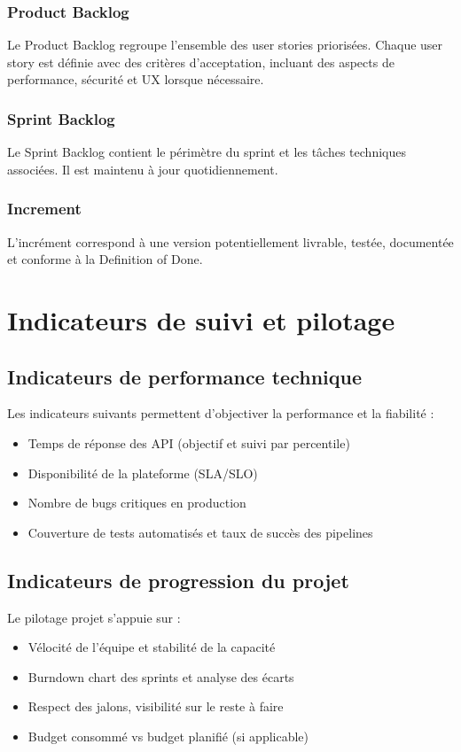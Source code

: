 \subsection{Product Backlog}
Le Product Backlog regroupe l’ensemble des user stories priorisées. Chaque user story est définie avec des critères d’acceptation, incluant des aspects de performance, sécurité et UX lorsque nécessaire.

\subsection{Sprint Backlog}
Le Sprint Backlog contient le périmètre du sprint et les tâches techniques associées. Il est maintenu à jour quotidiennement.

\subsection{Increment}
L’incrément correspond à une version potentiellement livrable, testée, documentée et conforme à la Definition of Done.


\chapter{Indicateurs de suivi et pilotage}

\section{Indicateurs de performance technique}
Les indicateurs suivants permettent d’objectiver la performance et la fiabilité :
\begin{itemize}
    \item Temps de réponse des API (objectif et suivi par percentile)
    \item Disponibilité de la plateforme (SLA/SLO)
    \item Nombre de bugs critiques en production
    \item Couverture de tests automatisés et taux de succès des pipelines
\end{itemize}

\section{Indicateurs de progression du projet}
Le pilotage projet s’appuie sur :
\begin{itemize}
    \item Vélocité de l’équipe et stabilité de la capacité
    \item Burndown chart des sprints et analyse des écarts
    \item Respect des jalons, visibilité sur le reste à faire
    \item Budget consommé vs budget planifié (si applicable)
\end{itemize}

